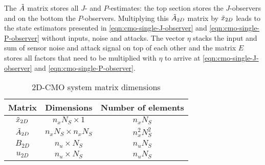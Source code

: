 The $\Tilde{A}$ matrix stores  all $J$- and $P$-estimates: the top section stores the $J$-observers and on the bottom the $P$-observers. Multiplying this $\Tilde{A}_{2D}$ matrix by $\Tilde{x}_{2D}$ leads to the state estimators presented in \eqref{eqn:cmo-single-J-observer} and \eqref{eqn:cmo-single-P-observer} without inputs, noise and attacks. The vector $\eta$ stacks the input and sum of sensor noise and attack signal on top of each other and the matrix $E$ stores all factors that need to be multiplied with $\eta$ to arrive at \eqref{eqn:cmo-single-J-observer} and \eqref{eqn:cmo-single-P-observer}.

\begin{table}[h]
    \centering
    \begin{tabular}{|c|c|c|}
       \toprule
       Matrix  & Dimensions & Number of elements \\ \midrule
       $\Tilde{x}_{2D}$  & $n_xN_S \times 1$ & $n_xN_S$ \\
       $\Tilde{A}_{2D}$ & $n_xN_S \times n_xN_S$ & $n_x^2N_S^2$ \\
       $B_{2D}$ & $n_u \times N_S$ & $n_uN_S$ \\
       $u_{2D}$ & $n_u \times N_S$ & $n_uN_S$ \\
       \bottomrule
    \end{tabular}
    \caption{2D-CMO system matrix dimensions}
    \label{tab:2D-CMO-dimensions}
\end{table}



\newpage
